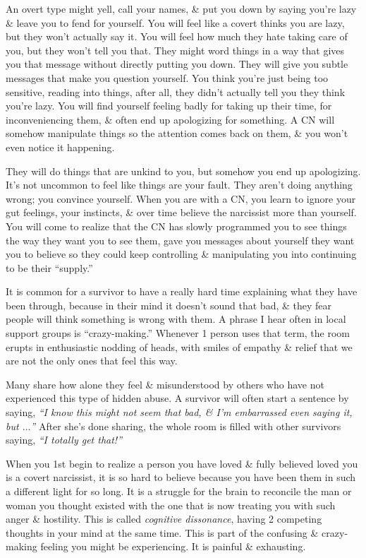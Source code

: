 \documentclass{article}
\numberwithin{equation}{section}
\begin{document}
An overt type might yell, call your names, \& put you down by saying you're lazy \& leave you to fend for yourself. You will feel like a covert thinks you are lazy, but they won't actually say it. You will feel how much they hate taking care of you, but they won't tell you that. They might word things in a way that gives you that message without directly putting you down. They will give you subtle messages that make you question yourself. You think you're just being too sensitive, reading into things, after all, they didn't actually tell you they think you're lazy. You will find yourself feeling badly for taking up their time, for inconveniencing them, \& often end up apologizing for something. A CN will somehow manipulate things so the attention comes back on them, \& you won't even notice it happening.

They will do things that are unkind to you, but somehow you end up apologizing. It's not uncommon to feel like things are your fault. They aren't doing anything wrong; you convince yourself. When you are with a CN, you learn to ignore your gut feelings, your instincts, \& over time believe the narcissist more than yourself. You will come to realize that the CN has slowly programmed you to see things the way they want you to see them, gave you messages about yourself they want you to believe so they could keep controlling \& manipulating you into continuing to be their ``supply.''

It is common for a survivor to have a really hard time explaining what they have been through, because in their mind it doesn't sound that bad, \& they fear people will think something is wrong with them. A phrase I hear often in local support groups is ``crazy-making.'' Whenever 1 person uses that term, the room erupts in enthusiastic nodding of heads, with smiles of empathy \& relief that we are not the only ones that feel this way.

Many share how alone they feel \& misunderstood by others who have not experienced this type of hidden abuse. A survivor will often start a sentence by saying, \textit{``I know this might not seem that bad, \& I'm embarrassed even saying it, but $\ldots$''} After she's done sharing, the whole room is filled with other survivors saying, \textit{``I totally get that!''}

When you 1st begin to realize a person you have loved \& fully believed loved you is a covert narcissist, it is so hard to believe because you have been them in such a different light for so long. It is a struggle for the brain to reconcile the man or woman you thought existed with the one that is now treating you with such anger \& hostility. This is called \textit{cognitive dissonance}, having 2 competing thoughts in your mind at the same time. This is part of the confusing \& crazy-making feeling you might be experiencing. It is painful \& exhausting.
\end{document}
